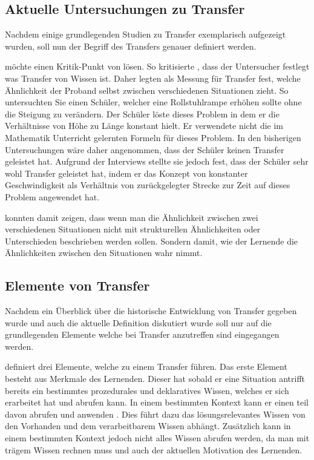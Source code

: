 \subsection{Aktuelle Untersuchungen zu Transfer}



Nachdem einige grundlegenden Studien zu Transfer exemplarisch aufgezeigt wurden, soll nun der Begriff des Transfers genauer definiert werden. 


\citet{Lobato2002a} möchte einen Kritik-Punkt von \citet{Lave1988} lösen. So kritisierte \citeauthor{Lave1988}, dass der Untersucher festlegt was Transfer von Wissen ist. Daher legten \citet{Lobato2002a} als Messung für Transfer fest, welche Ähnlichkeit der Proband selbst zwischen verschiedenen Situationen zieht. So untersuchten Sie einen Schüler, welcher eine Rollstuhlrampe erhöhen sollte ohne die Steigung zu verändern. Der Schüler löste dieses Problem in dem er die Verhältnisse von Höhe zu Länge konstant hielt. Er verwendete nicht die im Mathematik Unterricht gelernten Formeln für dieses Problem. In den bisherigen Untersuchungen wäre daher angenommen, dass der Schüler keinen Transfer geleistet hat. Aufgrund der Interviews stellte sie jedoch fest, dass der Schüler sehr wohl Transfer geleistet hat, indem er das Konzept von konstanter Geschwindigkeit als Verhältnis von zurückgelegter Strecke zur Zeit auf dieses Problem angewendet hat.

\citet{Lobato2002a} konnten damit zeigen, dass wenn man die Ähnlichkeit zwischen zwei verschiedenen Situationen nicht mit strukturellen Ähnlichkeiten oder Unterschieden beschrieben werden sollen. Sondern damit, wie der Lernende die Ähnlichkeiten zwischen den Situationen wahr nimmt.

\subsection{Elemente von Transfer}

Nachdem ein Überblick über die historische Entwicklung von Transfer gegeben wurde und auch die aktuelle Definition diskutiert wurde soll nur auf die grundlegenden Elemente welche bei Transfer anzutreffen sind eingegangen werden.

\citet{Marini1995} definiert drei Elemente, welche zu einem Transfer führen. Das erste Element besteht aus Merkmale des Lernenden. Dieser hat sobald er eine Situation antrifft bereits ein bestimmtes prozedurales und deklaratives Wissen, welches er sich erarbeitet hat und abrufen kann. In einem bestimmten Kontext kann er einen teil davon abrufen und anwenden \citep[s. S. 189ff]{Marini1995}. Dies führt dazu das lösungsrelevantes Wissen von den Vorhanden und dem verarbeitbarem Wissen abhängt. Zusätzlich kann in einem bestimmten Kontext jedoch nicht alles Wissen abrufen werden, da man mit trägem Wissen rechnen muss und auch der aktuellen Motivation des Lernenden. 

